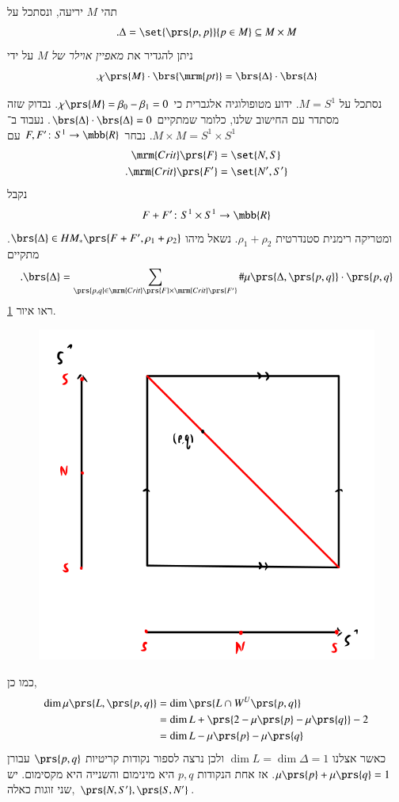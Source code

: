\documentclass[a4paper,10pt,twoside,openany]{book}
\begin{document}
\begin{example}
תהי
$M$
יריעה, ונסתכל על
\[\text{.} \Delta = \set{\prs{p,p}}{p \in M} \subseteq M \times M\]
ניתן להגדיר את
\emph{מאפיין אוילר של
$M$}
על ידי
\[\text{.} \chi\prs{M} \cdot \brs{\mrm{pt}} = \brs{\Delta} \cdot \brs{\Delta}\]

נסתכל על
$M = S^1$.
ידוע מטופולוגיה אלגברית כי
$\chi\prs{M} = \beta_0 - \beta_1 = 0$.
נבדוק שזה מסתדר עם החישוב שלנו, כלומר שמתקיים
$\brs{\Delta} \cdot \brs{\Delta} = 0$.
נעבוד ב־%
$M \times M = S^1 \times S^1$.
נבחר
$F, F' \colon S^1 \to \mbb{R}$
עם
\begin{align*}
\mrm{Crit}\prs{F} &= \set{N,S} \\
\text{.} \mrm{Crit}\prs{F'} &= \set{N',S'}
\end{align*}
נקבל
\[F + F' \colon S^1 \times S^1 \to \mbb{R}\]
ומטריקה רימנית סטנדרטית
$\rho_1 + \rho_2$.
נשאל מיהו
$\brs{\Delta} \in HM_*\prs{F + F', \rho_1 + \rho_2}$.
מתקיים
\[\text{.} \brs{\Delta} = \sum_{\prs{p,q} \in \mrm{Crit}\prs{F} \times \mrm{Crit}\prs{F'}} \# \mu\prs{\Delta, \prs{p,q}} \cdot \prs{p,q}\]
ראו איור
\ref{9.5}.

\begin{figure}
\centering
\includegraphics[scale=0.5]{sources/9.5}
\caption{}
\label{9.5}
\end{figure}

כמו כן,
\begin{align*}
\dim \mu\prs{L,\prs{p,q}} &= \dim\prs{L \cap W^U\prs{p,q}}
\\&= \dim L + \prs{2 - \mu\prs{p} - \mu\prs{q}} - 2
\\&= \dim L - \mu\prs{p} - \mu\prs{q}
\end{align*}
כאשר אצלנו
$\dim L = \dim \Delta = 1$
ולכן נרצה לספור נקודות קריטיות
$\prs{p,q}$
עבורן
$\mu\prs{p} + \mu\prs{q} = 1$.
אז אחת הנקודות
$p,q$
היא מינימום והשנייה היא מקסימום.
יש שני זוגות כאלה,
$\prs{N, S'}, \prs{S,N'}$.


\end{example}
\end{document}
